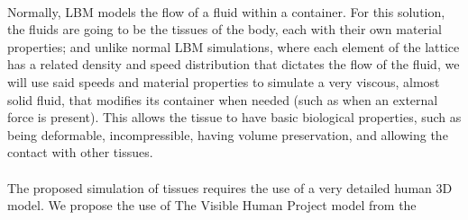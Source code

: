 \paragraph{}Normally, LBM models the flow of a fluid within a container. For this solution, the fluids are going to be the tissues of the body, each with their own material properties; and unlike normal LBM simulations, where each element of the lattice has a related density and speed distribution that dictates the flow of the fluid, we will use said speeds and material properties to simulate a very viscous, almost solid fluid, that modifies its container when needed (such as when an external force is present). This allows the tissue to have basic biological properties, such as being deformable, incompressible, having volume preservation, and allowing the contact with other tissues.

\paragraph{}The proposed simulation of tissues requires the use of a very detailed human 3D model. We propose the use of The Visible Human Project model \citep{visibleHumanProject} from the 














